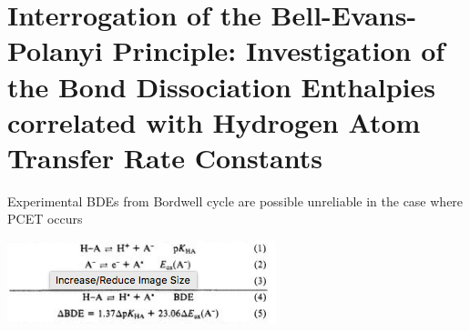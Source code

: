 \chapter{Interrogation of the Bell-Evans-Polanyi Principle: Investigation of the
Bond Dissociation Enthalpies correlated with Hydrogen Atom Transfer Rate Constants}
\label{ch:bdes}

Experimental BDEs from Bordwell\cite{Bordwell1988} cycle are possible unreliable
in the case where PCET occurs \cite{Miller2016}

\includegraphics{figures/bordwell}

